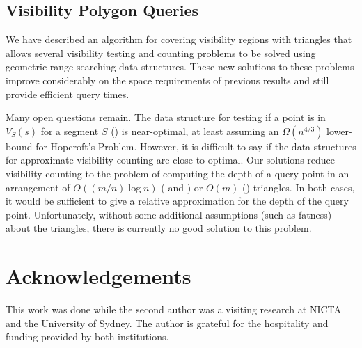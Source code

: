 \documentclass{patmorin}
\begin{document}
\subsection{Visibility Polygon Queries}

We have described an algorithm for covering visibility regions with
triangles that allows several visibility testing and counting problems
to be solved using geometric range searching data structures.  These new
solutions to these problems improve considerably on the space requirements
of previous results and still provide efficient query times.

Many open questions remain.  The data structure for testing if a point is
in $V_S(s)$ for a segment $S$ () is near-optimal,
at least assuming an $\Omega(n^{4/3})$ lower-bound for Hopcroft's
Problem.  However, it is difficult to say if the data structures for
approximate visibility counting are close to optimal.  Our solutions
reduce visibility counting to the problem of computing the depth of a
query point in an arrangement of $O((m/n)\log n)$ (
and ) or $O(m)$ () triangles.
In both cases, it would be sufficient to give a relative approximation
for the depth of the query point.  Unfortunately, without some additional
assumptions (such as fatness) about the triangles, there is currently
no good solution to this problem.

\section*{Acknowledgements}

This work was done while the second author was a visiting research at NICTA
and the University of Sydney.  The author is grateful for the hospitality
and funding provided by both institutions.
\end{document}
